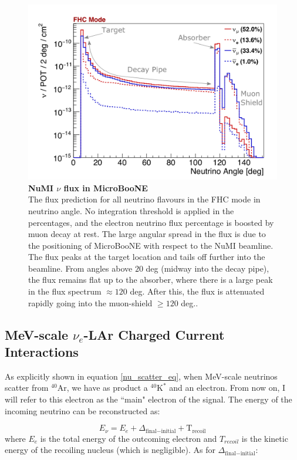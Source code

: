\begin{figure}[h!]
    \centering
    \includegraphics[width=130mm]{Figures/numi_nu_flux.jpeg}
    \caption[NuMI $\nu$ flux in MicroBooNE]{{\textbf{NuMI $\nu$ flux in MicroBooNE}}\\ The flux prediction for all neutrino flavours in the FHC mode in neutrino angle. No integration threshold is applied in the percentages, and the electron neutrino flux percentage is boosted by muon decay at rest. The large angular spread in the flux is due to the positioning of MicroBooNE with respect to the NuMI beamline. The flux peaks at the target location and tails off further into the beamline. From angles above $20$ deg (midway into the decay pipe), the flux remains flat up to the absorber, where there is a large peak in the flux spectrum $\approx 120$ deg. After this, the flux is attenuated rapidly going into the muon-shield $ \ge 120$ deg.\cite{krish_phd}.}
    \label{numi_nu_flux}
\end{figure}

\subsection{MeV-scale $\nu_e$-LAr Charged Current Interactions}

As explicitly shown in equation \ref{nu_scatter_eq}, when MeV-scale neutrinos scatter from $^{40}$Ar, we have as product a $^{40}\textrm{K}^{*}$ and an electron. From now on, I will refer to this electron as the ``main" electron of the signal. The energy of the incoming neutrino can be reconstructed as:

\begin{equation}
    E_{\nu} = E_e + \Delta_{\textrm{final}-\textrm{initial}} + \textrm{T}_{\textrm{recoil}} 
    \label{E_mudar_nu}
\end{equation}
where $E_e$ is the total energy of the outcoming electron and $T_{recoil}$ is the kinetic energy of the recoiling nucleus (which is negligible). As for $\Delta_{\textrm{final}-\textrm{initial}}$: 

